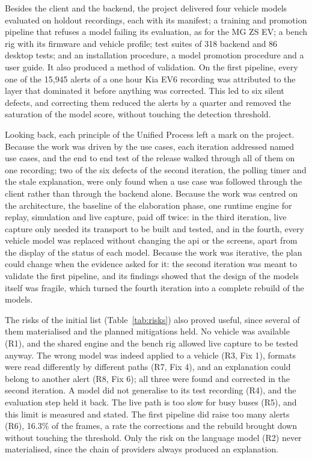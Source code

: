 Besides the client and the backend, the project delivered four vehicle models evaluated on holdout recordings, each with its manifest; a training and promotion pipeline that refuses a model failing its evaluation, as for the MG ZS EV; a bench rig with its firmware and vehicle profile; test suites of 318 backend and 86 desktop tests; and an installation procedure, a model promotion procedure and a user guide. It also produced a method of validation. On the first pipeline, every one of the 15{,}945 alerts of a one hour Kia EV6 recording was attributed to the layer that dominated it before anything was corrected. This led to six silent defects, and correcting them reduced the alerts by a quarter and removed the saturation of the model score, without touching the detection threshold.

Looking back, each principle of the Unified Process left a mark on the project. Because the work was driven by the use cases, each iteration addressed named use cases, and the end to end test of the release walked through all of them on one recording; two of the six defects of the second iteration, the polling timer and the stale explanation, were only found when a use case was followed through the client rather than through the backend alone. Because the work was centred on the architecture, the baseline of the elaboration phase, one runtime engine for replay, simulation and live capture, paid off twice: in the third iteration, live capture only needed its transport to be built and tested, and in the fourth, every vehicle model was replaced without changing the \gls{api} or the screens, apart from the display of the status of each model. Because the work was iterative, the plan could change when the evidence asked for it: the second iteration was meant to validate the first pipeline, and its findings showed that the design of the models itself was fragile, which turned the fourth iteration into a complete rebuild of the models.

The risks of the initial list (Table~\ref{tab:risks}) also proved useful, since several of them materialised and the planned mitigations held. No vehicle was available (R1), and the shared engine and the bench rig allowed live capture to be tested anyway. The wrong model was indeed applied to a vehicle (R3, Fix 1), formats were read differently by different paths (R7, Fix 4), and an explanation could belong to another alert (R8, Fix 6); all three were found and corrected in the second iteration. A model did not generalise to its test recording (R4), and the evaluation step held it back. The live path is too slow for busy buses (R5), and this limit is measured and stated. The first pipeline did raise too many alerts (R6), 16.3\% of the frames, a rate the corrections and the rebuild brought down without touching the threshold. Only the risk on the language model (R2) never materialised, since the chain of providers always produced an explanation.

